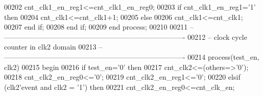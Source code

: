 \begin{DoxyCode}
00202             \textcolor{vhdlchar}{cnt_clk1_en_reg1}\textcolor{vhdlchar}{<=}\textcolor{vhdlchar}{cnt_clk1_en_reg0};
00203           \textcolor{keywordflow}{if} \textcolor{vhdlchar}{cnt_clk1_en_reg1}\textcolor{vhdlchar}{=}\textcolor{vhdlchar}{'}\textcolor{vhdllogic}{}\textcolor{vhdllogic}{1}\textcolor{vhdlchar}{'} \textcolor{keywordflow}{then} 
00204                 \textcolor{vhdlchar}{cnt_clk1}\textcolor{vhdlchar}{<=}\textcolor{vhdlchar}{cnt_clk1}\textcolor{vhdlchar}{+}\textcolor{vhdllogic}{}\textcolor{vhdllogic}{1};
00205             \textcolor{keywordflow}{else} 
00206                 \textcolor{vhdlchar}{cnt_clk1}\textcolor{vhdlchar}{<=}\textcolor{vhdlchar}{cnt_clk1};
00207             \textcolor{keywordflow}{end} \textcolor{keywordflow}{if};
00208         \textcolor{keywordflow}{end} \textcolor{keywordflow}{if};
00209     \textcolor{keywordflow}{end} \textcolor{keywordflow}{process};
00210 
00211 \textcolor{keyword}{-- ----------------------------------------------------------------------------}
00212 \textcolor{keyword}{-- clock cycle counter in clk2 domain}
00213 \textcolor{keyword}{-- ----------------------------------------------------------------------------}
00214   \textcolor{keywordflow}{process}(test_en, clk2)
00215 \textcolor{vhdlkeyword}{    begin}
00216       \textcolor{keywordflow}{if} \textcolor{vhdlchar}{test_en}\textcolor{vhdlchar}{=}\textcolor{vhdlchar}{'}\textcolor{vhdllogic}{}\textcolor{vhdllogic}{0}\textcolor{vhdlchar}{'} \textcolor{keywordflow}{then}
00217             \textcolor{vhdlchar}{cnt_clk2}\textcolor{vhdlchar}{<=}\textcolor{vhdlchar}{(}\textcolor{keywordflow}{others}\textcolor{vhdlchar}{=}\textcolor{vhdlchar}{>}\textcolor{vhdlchar}{'}\textcolor{vhdllogic}{}\textcolor{vhdllogic}{0}\textcolor{vhdlchar}{'}\textcolor{vhdlchar}{)};
00218             \textcolor{vhdlchar}{cnt_clk2_en_reg0}\textcolor{vhdlchar}{<=}\textcolor{vhdlchar}{'}\textcolor{vhdllogic}{}\textcolor{vhdllogic}{0}\textcolor{vhdlchar}{'};
00219             \textcolor{vhdlchar}{cnt_clk2_en_reg1}\textcolor{vhdlchar}{<=}\textcolor{vhdlchar}{'}\textcolor{vhdllogic}{}\textcolor{vhdllogic}{0}\textcolor{vhdlchar}{'}; 
00220         \textcolor{keywordflow}{elsif} \textcolor{vhdlchar}{(}\textcolor{vhdlchar}{clk2}\textcolor{vhdlchar}{'}\textcolor{vhdlkeyword}{event} \textcolor{keywordflow}{and} \textcolor{vhdlchar}{clk2} \textcolor{vhdlchar}{=} \textcolor{vhdlchar}{'}\textcolor{vhdllogic}{}\textcolor{vhdllogic}{1}\textcolor{vhdlchar}{'}\textcolor{vhdlchar}{)} \textcolor{keywordflow}{then}
00221             \textcolor{vhdlchar}{cnt_clk2_en_reg0}\textcolor{vhdlchar}{<=}\textcolor{vhdlchar}{cnt_clk_en};

\end{DoxyCode}
